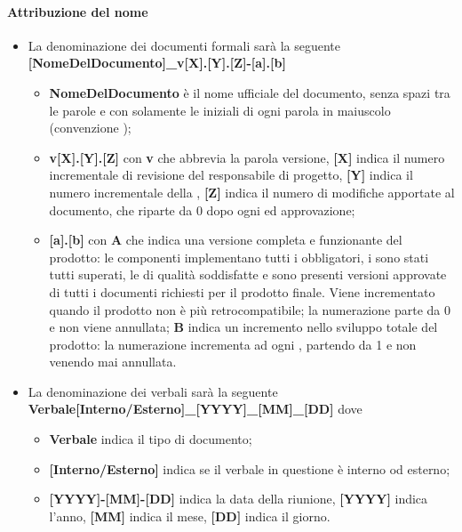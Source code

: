 {\paragraph{Attribuzione del nome}
\begin{itemize}
	\item La denominazione dei documenti formali sarà la seguente \newline
	\textbf{[NomeDelDocumento]\_v[X].[Y].[Z]-[a].[b]}
	\begin{itemize}
		\item \textbf{NomeDelDocumento} è il nome ufficiale del documento, senza spazi tra le parole e con solamente le iniziali di ogni parola in maiuscolo (convenzione );
		\item \textbf{v[X].[Y].[Z]} con \textbf{v} che abbrevia la parola versione, \textbf{[X]} indica il numero incrementale di revisione del responsabile di progetto, \textbf{[Y]} indica il numero incrementale della , \textbf{[Z]} indica il numero di modifiche apportate al documento, che riparte da 0 dopo ogni  ed approvazione;
		\item \textbf{[a].[b]} con \textbf{A} che indica una versione completa e funzionante del prodotto: le componenti 
implementano tutti i  obbligatori, i  sono stati tutti superati, le  di qualità soddisfatte e sono presenti versioni approvate di tutti i documenti richiesti per il prodotto finale. Viene incrementato quando il prodotto  non è più retrocompatibile; la numerazione parte da 0 e non viene annullata; \textbf{B} indica un incremento nello sviluppo totale del prodotto: la numerazione incrementa ad ogni , partendo da 1 e non venendo mai annullata.
	\end{itemize}
	\item La denominazione dei verbali sarà la seguente\newline
	\textbf{Verbale[Interno/Esterno]\_[YYYY]\_[MM]\_[DD]}\newline
	dove
	\begin{itemize}
		\item \textbf{Verbale} indica il tipo di documento;
		\item \textbf{[Interno/Esterno]} indica se il verbale in questione è interno od esterno;
		\item \textbf{[YYYY]-[MM]-[DD]} indica la data della riunione, \textbf{[YYYY]} indica l'anno, \textbf{[MM]} indica il mese, \textbf{[DD]} indica il giorno.
	\end{itemize}
\end{itemize}
}
